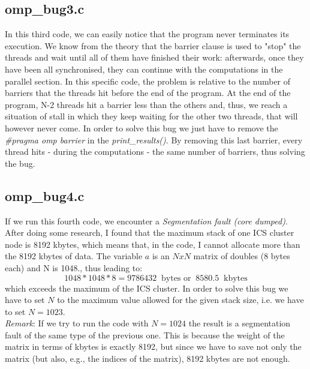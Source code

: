 \documentclass[unicode,11pt,a4paper,oneside,numbers=endperiod,openany]{scrartcl}
\begin{document}


\subsection{omp\_bug3.c}  
In this third code, we can easily notice that the program never terminates its execution. We know from the theory that the barrier clause is used to "stop" the threads and wait until all of them have finished their work: afterwards, once they have been all synchronised, they can continue with the computations in the parallel section. In this specific code, the problem is relative to the number of barriers that the threads hit before the end of the program. At the end of the program, N-2 threads hit a barrier less than the others and, thus, we reach a situation of stall in which they keep waiting for the other two threads, that will however never come. In order to solve this bug we just have to remove the \textit{\#pragma omp barrier} in the \textit{print\_results()}. By removing this last barrier, every thread hits - during the computations - the same number of barriers, thus solving the bug.\\



\subsection{omp\_bug4.c}
If we run this fourth code, we encounter a \textit{Segmentation fault (core dumped)}. After doing some research, I found that the maximum stack of one ICS cluster node is 8192 kbytes, which means that, in the code, I cannot allocate more than the 8192 kbytes of data. The variable $a$ is an $NxN$ matrix of doubles (8 bytes each) and N is 1048., thus leading to:
\begin{equation*}
	1048 * 1048 * 8 = 9786432\;\; \text{bytes or}\;\; 8580.5 \;\;\text{kbytes} 
\end{equation*}
which exceeds the maximum of the ICS cluster.
In order to solve this bug we have to set $N$ to the maximum value allowed for the given stack size, i.e. we have to set $N=1023$.\\

\textit{Remark}: If we try to run the code with $N = 1024$ the result is a segmentation fault of the same type of the previous one. This is because the weight of the matrix in terms of kbytes is exactly 8192, but since we have to save not only the matrix (but also, e.g., the indices of the matrix), 8192 kbytes are not enough.\\
\end{document}
